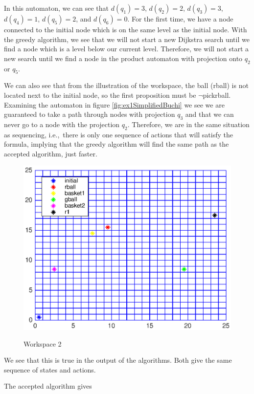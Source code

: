 In this automaton, we can see that $d(q_1)=3$, $d(q_2)=2$, $d(q_3)=3$, $d(q_4)=1$, $d(q_5)=2$, and $d(q_6)=0$. For the first time, we have a node connected to the initial node which is on the same level as the initial node. With the greedy algorithm, we see that we will not start a new Dijkstra search until we find a node which is a level below our current level. Therefore, we will not start a new search until we find a node in the product automaton with projection onto $q_2$ or $q_5$. 

We can also see that from the illustration of the workspace, the ball (rball) is not located next to the initial node, so the first proposition must be $\neg$pickrball. Examining the automaton in figure \ref{fig:ex1SimplifiedBuchi} we see we are guaranteed to take a path through nodes with projection $q_3$ and that we can never go to a node with the projection $q_2$. Therefore, we are in the same situation as sequencing, i.e.,\ there is only one sequence of actions that will satisfy the formula, implying that the greedy algorithm will find the same path as the accepted algorithm, just faster. 

\begin{figure}[!htb]
\centering
\includegraphics[scale=1]{workspace2.eps}
\label{fig:workspace2}
\caption{Workspace 2}
\end{figure}

We see that this is true in the output of the algorithms. Both give the same sequence of states and actions.

The accepted algorithm gives \\


